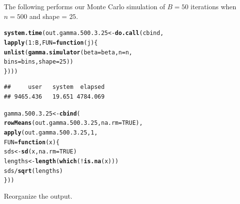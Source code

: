 \documentclass[11pt]{article}\usepackage[]{graphicx}\usepackage[]{color}
\makeatletter
\newcommand{\hlnum}[1]{\textcolor[rgb]{0.686,0.059,0.569}{#1}}%
\newcommand{\hlopt}[1]{\textcolor[rgb]{0,0,0}{#1}}%
\newcommand{\hlstd}[1]{\textcolor[rgb]{0.345,0.345,0.345}{#1}}%
\newcommand{\hlkwa}[1]{\textcolor[rgb]{0.161,0.373,0.58}{\textbf{#1}}}%
\newcommand{\hlkwb}[1]{\textcolor[rgb]{0.69,0.353,0.396}{#1}}%
\newcommand{\hlkwc}[1]{\textcolor[rgb]{0.333,0.667,0.333}{#1}}%
\newcommand{\hlkwd}[1]{\textcolor[rgb]{0.737,0.353,0.396}{\textbf{#1}}}%
\newenvironment{kframe}{%
 \def\at@end@of@kframe{}%
 \ifinner\ifhmode%
  \def\at@end@of@kframe{\end{minipage}}%
  \begin{minipage}{\columnwidth}%
 \fi\fi%
 \def\FrameCommand##1{\hskip\@totalleftmargin \hskip-\fboxsep
 \colorbox{shadecolor}{##1}\hskip-\fboxsep
     \hskip-\linewidth \hskip-\@totalleftmargin \hskip\columnwidth}%
 \MakeFramed {\advance\hsize-\width
   \@totalleftmargin\z@ \linewidth\hsize
   \@setminipage}}%
 {\par\unskip\endMakeFramed%
 \at@end@of@kframe}
\newenvironment{knitrout}{}{} %
\makeatother
\begin{document}
The following performs our Monte Carlo simulation of $B = 50$ iterations 
when $n = 500$ and shape = $25$.

\begin{knitrout}
\color{fgcolor}\begin{kframe}
\begin{alltt}
\hlkwd{system.time}\hlstd{(out.gamma.500.3.25} \hlkwb{<-} \hlkwd{do.call}\hlstd{(cbind,}
  \hlkwd{lapply}\hlstd{(}\hlnum{1}\hlopt{:}\hlstd{B,} \hlkwc{FUN} \hlstd{=} \hlkwa{function}\hlstd{(}\hlkwc{j}\hlstd{)\{}
    \hlkwd{unlist}\hlstd{(}\hlkwd{gamma.simulator}\hlstd{(}\hlkwc{beta} \hlstd{= beta,} \hlkwc{n} \hlstd{= n,}
      \hlkwc{bins} \hlstd{= bins,} \hlkwc{shape} \hlstd{=} \hlnum{25}\hlstd{))}
\hlstd{\})))}
\end{alltt}
\begin{verbatim}
##     user   system  elapsed 
## 9465.436   19.651 4784.069
\end{verbatim}
\end{kframe}
\end{knitrout}

\begin{knitrout}
\color{fgcolor}\begin{kframe}
\begin{alltt}
\hlstd{gamma.500.3.25} \hlkwb{<-} \hlkwd{cbind}\hlstd{(}
  \hlkwd{rowMeans}\hlstd{(out.gamma.500.3.25,} \hlkwc{na.rm} \hlstd{=} \hlnum{TRUE}\hlstd{),}
  \hlkwd{apply}\hlstd{(out.gamma.500.3.25,} \hlnum{1}\hlstd{,}
  \hlkwc{FUN} \hlstd{=} \hlkwa{function}\hlstd{(}\hlkwc{x}\hlstd{)\{}
    \hlstd{sds} \hlkwb{<-} \hlkwd{sd}\hlstd{(x,} \hlkwc{na.rm} \hlstd{=} \hlnum{TRUE}\hlstd{)}
    \hlstd{lengths} \hlkwb{<-} \hlkwd{length}\hlstd{(}\hlkwd{which}\hlstd{(}\hlopt{!}\hlkwd{is.na}\hlstd{(x)))}
    \hlstd{sds} \hlopt{/} \hlkwd{sqrt}\hlstd{(lengths)}
  \hlstd{\}))}
\end{alltt}
\end{kframe}
\end{knitrout}


Reorganize the output.
\end{document}
